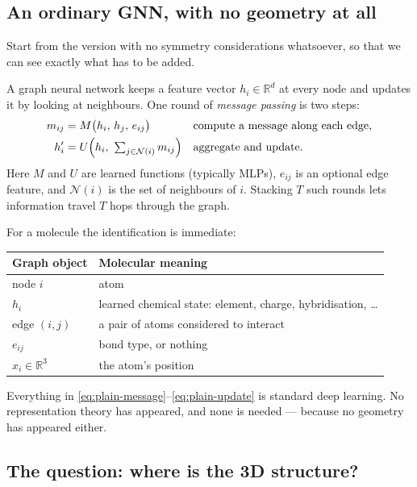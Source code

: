 \documentclass[11pt,a4paper]{report}
\theoremstyle{definition}
\theoremstyle{remark}
\newcommand{\RR}{\mathbb R}
\begin{document}
\subsection{An ordinary GNN, with no geometry at all}
\label{sec:plain-gnn}

Start from the version with no symmetry considerations whatsoever, so that we
can see exactly what has to be added.

A graph neural network keeps a feature vector $h_i\in\RR^d$ at every node and
updates it by looking at neighbours. One round of \emph{message passing} is
two steps:
\begin{align}
\label{eq:plain-message}
m_{ij} &= M\bigl(h_i,\,h_j,\,e_{ij}\bigr)
&&\text{compute a message along each edge,}\\
\label{eq:plain-update}
h_i' &= U\Bigl(h_i,\ \textstyle\sum_{j\in\mathcal N(i)}m_{ij}\Bigr)
&&\text{aggregate and update.}
\end{align}
Here $M$ and $U$ are learned functions (typically MLPs), $e_{ij}$ is an
optional edge feature, and $\mathcal N(i)$ is the set of neighbours of $i$.
Stacking $T$ such rounds lets information travel $T$ hops through the graph.

For a molecule the identification is immediate:
\begin{center}
\begin{tabular}{ll}
\toprule
Graph object & Molecular meaning \\
\midrule
node $i$ & atom \\
$h_i$ & learned chemical state: element, charge, hybridisation, \dots \\
edge $(i,j)$ & a pair of atoms considered to interact \\
$e_{ij}$ & bond type, or nothing \\
$x_i\in\RR^3$ & the atom's position \\
\bottomrule
\end{tabular}
\end{center}

Everything in \eqref{eq:plain-message}--\eqref{eq:plain-update} is standard
deep learning. No representation theory has appeared, and none is needed ---
because no geometry has appeared either.

\subsection{The question: where is the 3D structure?}
\label{sec:where-is-geometry}
\end{document}
